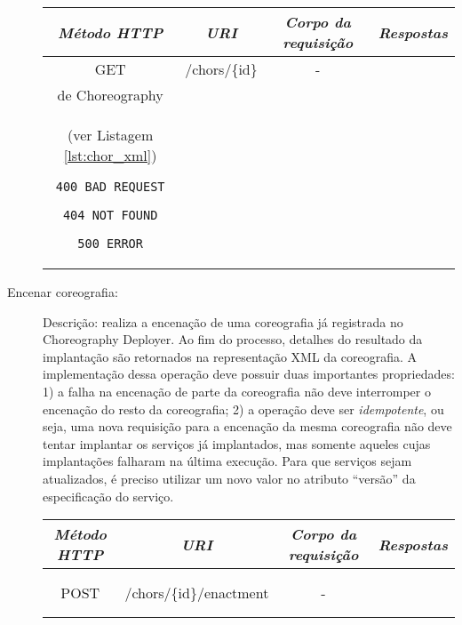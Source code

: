 \begin{description}
{\small
\begin{tabular}{|c|c|c|c|}
\hline 
\itshape{Método HTTP} & \itshape{URI} & \itshape{Corpo da requisição} & \itshape{Respostas} \\ 
\hline 
GET & /chors/\{id\} & - &
\begin{minipage}{2in}
\begin{verbatim}

200 OK
location = "/chors/{id}"
Corpo: 
\end{verbatim}
Representação XML \\ de \textsf{Choreography}\\ 
(ver Listagem \ref{lst:chor_xml})

\begin{verbatim}
400 BAD REQUEST

404 NOT FOUND

500 ERROR

\end{verbatim}
\end{minipage} 
\\ 
\hline 
\end{tabular}
}

\item [Encenar coreografia:]

Descrição: realiza a encenação de uma coreografia já registrada no Choreography Deployer. Ao fim do processo, detalhes do resultado da implantação são retornados na representação XML da coreografia. A implementação dessa operação deve possuir duas importantes propriedades: 1) a falha na encenação de parte da coreografia não deve interromper o encenação do resto da coreografia; 2) a operação deve ser \emph{idempotente}, ou seja, uma nova requisição para a encenação da mesma coreografia não deve tentar implantar os serviços já implantados, mas somente aqueles cujas implantações falharam na última execução. Para que serviços sejam atualizados, é preciso utilizar um novo valor no atributo ``versão'' da especificação do serviço.

%
%

{\small
\begin{tabular}{|c|c|c|c|}
\hline 
\itshape{Método HTTP} & \itshape{URI} & \itshape{Corpo da requisição} & \itshape{Respostas} \\ 
\hline 
POST & /chors/\{id\}/enactment & - &
\begin{minipage}{2in}
\begin{verbatim}


\end{verbatim}
\end{minipage}
\end{tabular}}
\end{description}
